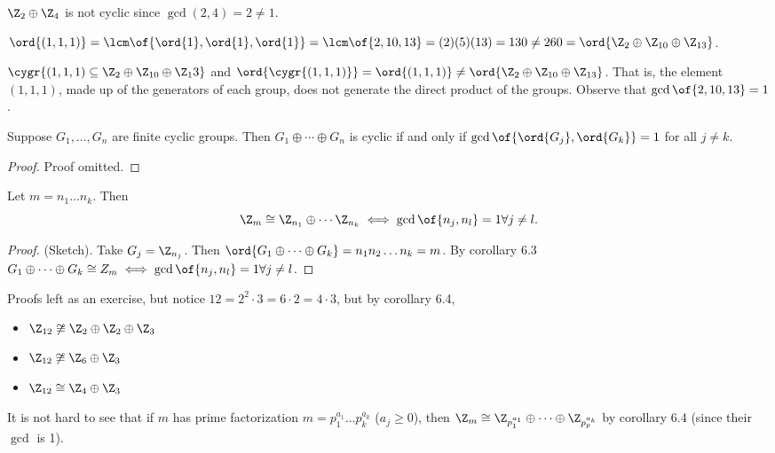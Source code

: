 \begin{example}
    $\Z_2 \oplus \Z_4$ is not cyclic since $\gcd (2,4) = 2 \neq 1$.
\end{example}

\begin{example}
    $\ord{(1,1,1)} = \lcm\of{\ord{1},\ord{1},\ord{1}} = \lcm\of{2,10,13} = (2)(5)(13) = 130 \neq 260 = \ord{\Z_2 \oplus \Z_{10} \oplus \Z_{13}}$.

    $\cygr{(1,1,1) \subseteq \Z_2 \oplus \Z_{10} \oplus \Z_13}$ and $\ord{\cygr{(1,1,1)}} = \ord{(1,1,1)} \neq \ord{\Z_2 \oplus \Z_{10} \oplus \Z_{13}}$. That is, the element $(1,1,1)$, made up of the generators of each group, does not generate the direct product of the groups. Observe that $\gcd\of{2,10,13} = 1$.
\end{example}

\begin{corollary}
    Suppose $G_1, \dots, G_n$ are finite cyclic groups. Then $G_1 \oplus \cdots \oplus G_n$ is cyclic if and only if $\gcd\of{\ord{G_j}, \ord{G_k}} = 1$ for all $j \neq k$.
\end{corollary}
\begin{proof}
    Proof omitted.
\end{proof}

\begin{corollary}
    Let $m = n_1 \dots n_k$. Then \[\Z_m \cong \Z_{n_1} \oplus \cdots \Z_{n_k} \iff \gcd\of{n_j, n_l} = 1 \forall j \neq l.\]
\end{corollary}
\begin{proof}
    (Sketch). Take $G_j = \Z_{n_j}$. Then $\ord{G_1 \oplus \cdots \oplus G_k} = n_1 n_2 \dots n_k = m$. By corollary 6.3 $G_1 \oplus \cdots \oplus G_k \cong Z_m \iff \gcd\of{n_j, n_l} = 1 \forall j \neq l$.
\end{proof}

\begin{example}
    Proofs left as an exercise, but notice $12 = 2^2 \cdot 3 = 6 \cdot 2 = 4 \cdot 3$, but by corollary 6.4,
    \begin{itemize}
        \item $\Z_{12} \not\cong \Z_2 \oplus \Z_2 \oplus \Z_3$
        \item $\Z_{12} \not\cong \Z_6 \oplus \Z_3$
        \item $\Z_{12} \cong \Z_4 \oplus \Z_3$
    \end{itemize}
\end{example}

It is not hard to see that if $m$ has prime factorization $m = p_1^{a_1} \dots p_k^{a_k}$ ($a_j \geq 0$), then $\Z_m \cong \Z_{p_1^{a_1}} \oplus \cdots \oplus \Z_{p_p^{a_k}}$ by corollary 6.4 (since their $\gcd$ is 1).

